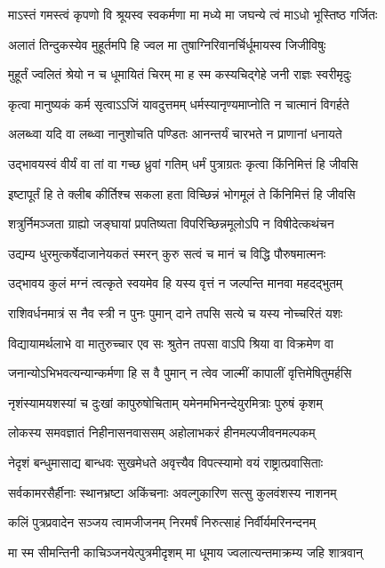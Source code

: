 \twolineshloka
{माऽस्तं गमस्त्वं कृपणो वि श्रूयस्व स्वकर्मणा}
{मा मध्ये मा जघन्ये त्वं माऽधो भूस्तिष्ठ गर्जितः}


\twolineshloka
{अलातं तिन्दुकस्येव मुहूर्तमपि हि ज्वल}
{मा तुषाग्निरिवानर्चिर्धूमायस्व जिजीविषुः}


\twolineshloka
{मुहूर्तं ज्वलितं श्रेयो न च धूमायितं चिरम्}
{मा ह स्म कस्यचिद्गेहे जनी राज्ञः स्वरीमृदुः}


\twolineshloka
{कृत्वा मानुष्यकं कर्म सृत्वाऽऽजिं यावदुत्तमम्}
{धर्मस्यानृण्यमाप्नोति न चात्मानं विगर्हते}


\twolineshloka
{अलब्ध्वा यदि वा लब्ध्वा नानुशोचति पण्डितः}
{आनन्तर्यं चारभते न प्राणानां धनायते}


\twolineshloka
{उद्भावयस्वं वीर्यं वा तां वा गच्छ ध्रुवां गतिम्}
{धर्मं पुत्राग्रतः कृत्वा किंनिमित्तं हि जीवसि}


\twolineshloka
{इष्टापूर्तं हि ते क्लीब कीर्तिश्च सकला हता}
{विच्छिन्नं भोगमूलं ते किंनिमित्तं हि जीवसि}


\twolineshloka
{शत्रुर्निमञ्जता ग्राह्यो जङ्घायां प्रपतिष्यता}
{विपरिच्छिन्नमूलोऽपि न विषीदेत्कथंचन}


\threelineshloka
{उद्यम्य धुरमुत्कर्षेदाजानेयकतं स्मरन्}
{कुरु सत्वं च मानं च विद्धि पौरुषमात्मनः}
{}


\twolineshloka
{उद्भावय कुलं मग्नं त्वत्कृते स्वयमेव हि}
{यस्य वृत्तं न जल्पन्ति मानवा महदद्भुतम्}


\twolineshloka
{राशिवर्धनमात्रं स नैव स्त्री न पुनः पुमान्}
{दाने तपसि सत्ये च यस्य नोच्चरितं यशः}


\twolineshloka
{विद्यायामर्थलाभे वा मातुरुच्चार एव सः}
{श्रुतेन तपसा वाऽपि श्रिया वा विक्रमेण वा}


\twolineshloka
{जनान्योऽभिभवत्यन्यान्कर्मणा हि स वै पुमान्}
{न त्वेव जाल्मीं कापालीं वृत्तिमेषितुमर्हसि}


\twolineshloka
{नृशंस्यामयशस्यां च दुःखां कापुरुषोचिताम्}
{यमेनमभिनन्देयुरमित्राः पुरुषं कृशम्}


\twolineshloka
{लोकस्य समवज्ञातं निहीनासनवाससम्}
{अहोलाभकरं हीनमल्पजीवनमल्पकम्}


\twolineshloka
{नेदृशं बन्धुमासाद्य बान्धवः सुखमेधते}
{अवृत्त्यैव विपत्स्यामो वयं राष्ट्रात्प्रवासिताः}


\twolineshloka
{सर्वकामरसैर्हीनाः स्थानभ्रष्टा अकिंचनाः}
{अवल्गुकारिण सत्सु कुलवंशस्य नाशनम्}


\twolineshloka
{कलिं पुत्रप्रवादेन सञ्जय त्वामजीजनम्}
{निरमर्षं निरुत्साहं निर्वीर्यमरिनन्दनम्}


\twolineshloka
{मा स्म सीमन्तिनी काचिञ्जनयेत्पुत्रमीदृशम्}
{मा धूमाय ज्वलात्यन्तमाक्रम्य जहि शात्रवान्}


